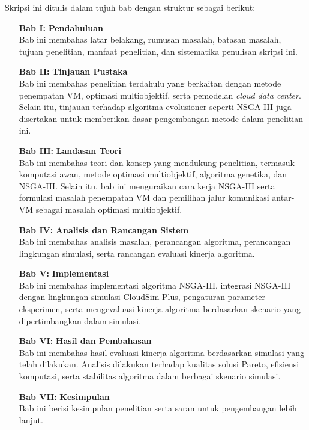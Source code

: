Skripsi ini ditulis dalam tujuh bab dengan struktur sebagai berikut:
\begin{enumerate}
 \item[\textbf{Bab I:}] \textbf{Pendahuluan} \\
    Bab ini membahas latar belakang, rumusan masalah, batasan masalah, tujuan penelitian, manfaat penelitian, dan sistematika penulisan skripsi ini.
    
 \item[\textbf{Bab II:}] \textbf{Tinjauan Pustaka} \\
    Bab ini membahas penelitian terdahulu yang berkaitan dengan metode penempatan VM, optimasi multiobjektif, serta pemodelan \textit{cloud data center}. Selain itu, tinjauan terhadap algoritma evolusioner seperti NSGA-III juga disertakan untuk memberikan dasar pengembangan metode dalam penelitian ini.
    
 \item[\textbf{Bab III:}] \textbf{Landasan Teori} \\  
    Bab ini membahas teori dan konsep yang mendukung penelitian, termasuk komputasi awan, metode optimasi multiobjektif, algoritma genetika, dan NSGA-III. Selain itu, bab ini menguraikan cara kerja NSGA-III serta formulasi masalah penempatan VM dan pemilihan jalur komunikasi antar-VM sebagai masalah optimasi multiobjektif.
    
 \item[\textbf{Bab IV:}] \textbf{Analisis dan Rancangan Sistem} \\
    Bab ini membahas analisis masalah, perancangan algoritma, perancangan lingkungan simulasi, serta rancangan evaluasi kinerja algoritma.
    
 \item[\textbf{Bab V:}] \textbf{Implementasi} \\
    Bab ini membahas implementasi algoritma NSGA-III, integrasi NSGA-III dengan lingkungan simulasi CloudSim Plus, pengaturan parameter eksperimen, serta mengevaluasi kinerja algoritma berdasarkan skenario yang dipertimbangkan dalam simulasi.
    
 \item[\textbf{Bab VI:}] \textbf{Hasil dan Pembahasan} \\
    Bab ini membahas hasil evaluasi kinerja algoritma berdasarkan simulasi yang telah dilakukan. Analisis dilakukan terhadap kualitas solusi Pareto, efisiensi komputasi, serta stabilitas algoritma dalam berbagai skenario simulasi.
    
 \item[\textbf{Bab VII:}] \textbf{Kesimpulan} \\
    Bab ini berisi kesimpulan penelitian serta saran untuk pengembangan lebih lanjut.
\end{enumerate}
